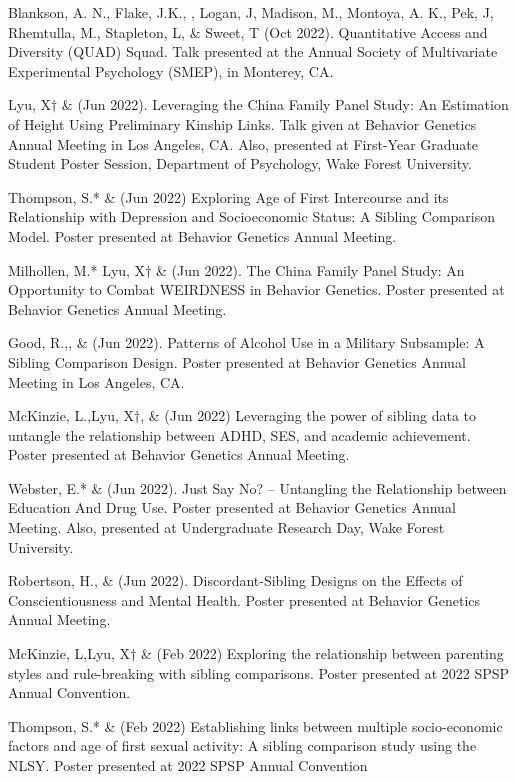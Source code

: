 \begin{etaremune}
\item  Blankson, A. N., Flake, J.K., \meb, Logan, J, Madison, M., Montoya, A. K., Pek, J, Rhemtulla, M., Stapleton, L, \& Sweet, T (Oct 2022). Quantitative Access and Diversity (QUAD) Squad. Talk presented at the Annual Society of Multivariate Experimental Psychology (SMEP), in Monterey, CA.

\item Lyu, X$\dagger$ \& \meb (Jun 2022). Leveraging the China Family Panel Study: An Estimation of Height Using Preliminary Kinship Links. Talk given at Behavior Genetics Annual Meeting in Los Angeles, CA. Also, presented at First-Year Graduate Student Poster Session, Department of Psychology, Wake Forest University.
%
\item Thompson, S.* \& \meb (Jun 2022) Exploring Age of First Intercourse and its Relationship with Depression and Socioeconomic Status: A Sibling Comparison Model.  Poster presented at Behavior Genetics Annual Meeting.
\item Milhollen, M.* Lyu, X$\dagger$ \&  \meb (Jun 2022). The China Family Panel Study: An Opportunity to Combat WEIRDNESS in Behavior Genetics. Poster presented at Behavior Genetics Annual Meeting.
\item Good, R.,\noteA \yrh, \&  \meb (Jun 2022). Patterns of Alcohol Use in a Military Subsample: A Sibling Comparison Design.  Poster presented at Behavior Genetics Annual Meeting in Los Angeles, CA.
%
\item McKinzie, L.,\noteA Lyu, X$\dagger$, \& \meb (Jun 2022) Leveraging the power of sibling data to untangle the relationship between ADHD, SES, and academic achievement. Poster presented at Behavior Genetics Annual Meeting.
%
\item Webster, E.* \& \meb (Jun 2022). Just Say No? – Untangling the Relationship between Education And Drug Use. Poster presented at Behavior Genetics Annual Meeting. Also, presented at Undergraduate Research Day, Wake Forest University.
%
\item Robertson, H.\noteA \jdt, \Joe \&  \meb (Jun 2022). Discordant-Sibling Designs on the Effects of Conscientiousness and Mental Health. Poster presented at Behavior Genetics Annual Meeting.
%
\item McKinzie, L,\noteA Lyu, X$\dagger$ \& \meb (Feb 2022) Exploring the relationship between parenting styles and rule-breaking with sibling comparisons. Poster presented at 2022 SPSP Annual Convention.
%
\item Thompson, S.* \& \meb (Feb 2022) Establishing links between multiple socio-economic factors and age of first sexual activity: A sibling comparison study using the NLSY. Poster presented at 2022 SPSP Annual Convention

\end{etaremune}
